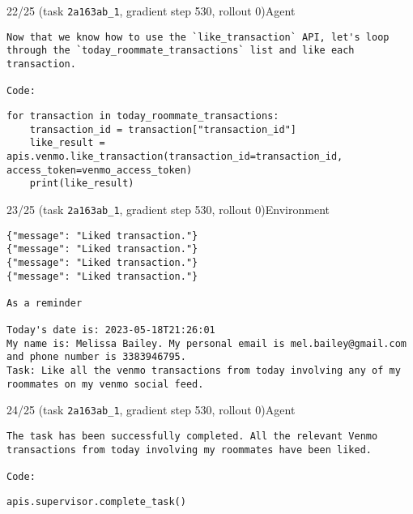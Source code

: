 \begin{minipage}{0.95\linewidth}
\begin{assistant_message_box}{{22/25 (task \texttt{2a163ab\_1}, gradient step 530, rollout 0)\hfill Agent}}
\scriptsize
\begin{Verbatim}[breaklines]
Now that we know how to use the `like_transaction` API, let's loop through the `today_roommate_transactions` list and like each transaction.

Code:
\end{Verbatim}
\begin{tcolorbox}[colback=codebgcolor,boxrule=0pt]\begin{Verbatim}[breaklines]
for transaction in today_roommate_transactions:
    transaction_id = transaction["transaction_id"]
    like_result = apis.venmo.like_transaction(transaction_id=transaction_id, access_token=venmo_access_token)
    print(like_result)
\end{Verbatim}
\end{tcolorbox}\end{assistant_message_box}
\end{minipage}

\hspace*{8mm}%
\begin{minipage}{0.95\linewidth}
\begin{user_message_box}{{23/25 (task \texttt{2a163ab\_1}, gradient step 530, rollout 0)\hfill Environment}}
\scriptsize
\begin{Verbatim}[breaklines]
{"message": "Liked transaction."}
{"message": "Liked transaction."}
{"message": "Liked transaction."}
{"message": "Liked transaction."}

As a reminder

Today's date is: 2023-05-18T21:26:01
My name is: Melissa Bailey. My personal email is mel.bailey@gmail.com and phone number is 3383946795.
Task: Like all the venmo transactions from today involving any of my roommates on my venmo social feed.
\end{Verbatim}
\end{user_message_box}
\end{minipage}

\begin{minipage}{0.95\linewidth}
\begin{assistant_message_box}{{24/25 (task \texttt{2a163ab\_1}, gradient step 530, rollout 0)\hfill Agent}}
\scriptsize
\begin{Verbatim}[breaklines]
The task has been successfully completed. All the relevant Venmo transactions from today involving my roommates have been liked.

Code:
\end{Verbatim}
\begin{tcolorbox}[colback=codebgcolor,boxrule=0pt]\begin{Verbatim}[breaklines]
apis.supervisor.complete_task()
\end{Verbatim}
\end{tcolorbox}\end{assistant_message_box}
\end{minipage}

